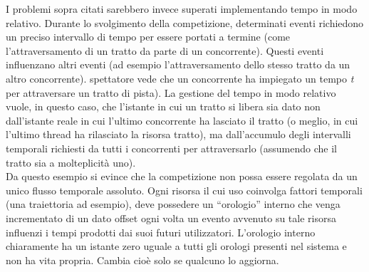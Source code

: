 I problemi sopra citati sarebbero invece superati implementando tempo in modo
relativo. Durante lo svolgimento della competizione, 
determinati eventi richiedono un preciso
intervallo di tempo per essere portati a termine (come l'attraversamento di un
tratto da parte di un concorrente). 
Questi eventi influenzano altri eventi (ad esempio
l'attraversamento dello stesso tratto da un altro concorrente). 
spettatore vede che un concorrente ha impiegato un tempo \emph{t} per
attraversare un tratto di pista).
La gestione del tempo in modo relativo vuole, in questo caso, che l'istante in
cui un tratto si libera sia dato
non dall'istante reale in cui l'ultimo concorrente ha lasciato il tratto (o
meglio, in cui l'ultimo thread ha rilasciato
la risorsa tratto), ma dall'accumulo degli intervalli temporali richiesti da
tutti i concorrenti per attraversarlo (assumendo che il tratto
sia a molteplicità uno).\\
Da questo esempio si evince che la competizione non possa essere regolata da un
unico flusso temporale assoluto. Ogni risorsa il cui uso
coinvolga fattori temporali (una traiettoria ad esempio), deve
possedere un ``orologio'' interno che venga incrementato di un dato offset ogni
volta un evento avvenuto su tale risorsa influenzi i tempi
prodotti dai suoi futuri utilizzatori. L'orologio interno chiaramente ha un
istante zero uguale a tutti gli orologi presenti nel sistema
e non ha vita propria. Cambia cioè solo se qualcuno lo aggiorna.\\
